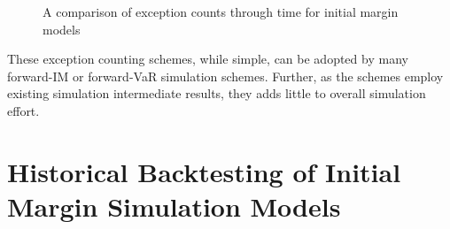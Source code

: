 \documentclass[preprint,12pt]{elsarticle}
\begin{document}
\begin{figure}[h] 
\hfill
{}
\hfill
{}
\hfill
{}
\hfill
\caption{A comparison of exception counts through time for initial margin models}
\label{fig:ExceptionThroughTime}
\end{figure}

These exception counting schemes, while simple, can be adopted by many forward-IM or forward-VaR simulation schemes. Further, as the schemes employ existing simulation intermediate results, they adds little to overall simulation effort.

\section{Historical Backtesting of Initial Margin Simulation Models} \label{sec:backtesting}
\end{document}
